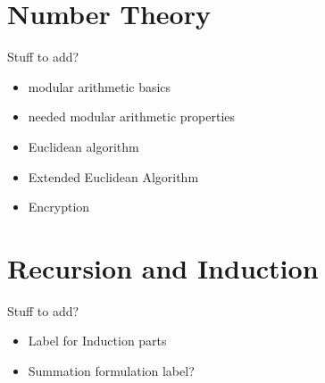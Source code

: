 \documentclass{exam}
\begin{document}
\section*{Number Theory}

Stuff to add?
\begin{itemize}
    \item modular arithmetic basics
    \item needed modular arithmetic properties
    \item Euclidean algorithm
    \item Extended Euclidean Algorithm
    \item Encryption 
\end{itemize}

\section*{Recursion and Induction}
Stuff to add?
\begin{itemize}
    \item Label for Induction parts
    \item Summation formulation label? 
\end{itemize}
\end{document}

